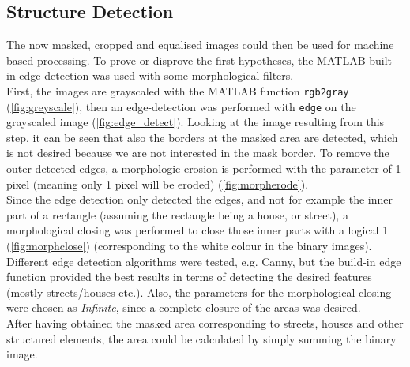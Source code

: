 \subsection{Structure Detection}
The now masked, cropped and equalised images could then be used for machine based processing. To prove or disprove the first hypotheses, the MATLAB built-in edge detection was used with some morphological filters. \\
First, the images are grayscaled with the MATLAB function \texttt{rgb2gray} (\cref{fig:greyscale}), then an edge-detection was performed with \texttt{edge} on the grayscaled image (\cref{fig:edge_detect}). Looking at the image resulting from this step, it can be seen that also the borders at the masked area are detected, which is not desired because we are not interested in the mask border. To remove the outer detected edges, a morphologic erosion is performed with the parameter of 1 pixel (meaning only 1 pixel will be eroded) (\cref{fig:morpherode}). \\
Since the edge detection only detected the edges, and not for example the inner part of a rectangle (assuming the rectangle being a house, or street), a morphological closing was performed to close those inner parts with a logical 1 (\cref{fig:morphclose}) (corresponding to the white colour in the binary images). Different edge detection algorithms were tested, e.g. Canny, but the build-in edge function provided the best results in terms of detecting the desired features (mostly streets/houses etc.). Also, the parameters for the morphological closing were chosen as \textit{Infinite}, since a complete closure of the  areas was desired.\\
After having obtained the masked area corresponding to streets, houses and other structured elements, the area could be calculated by simply summing the binary image.


